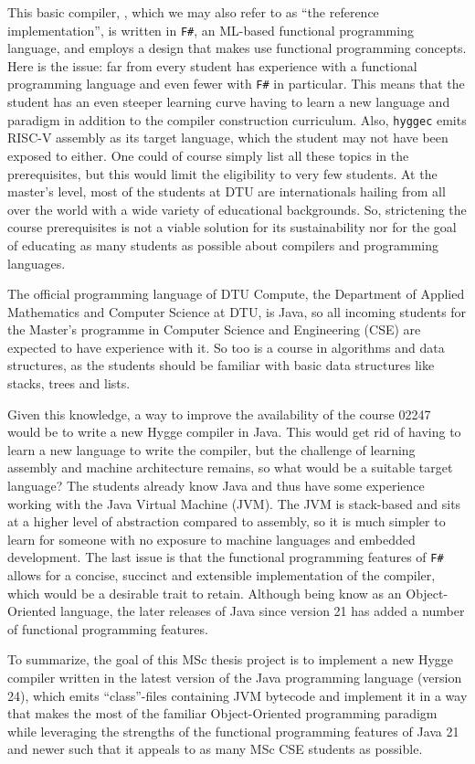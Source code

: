This basic compiler, , which we may also refer to as ``the reference implementation'', is written in \texttt{F#},
an ML-based functional programming language, and employs a design that makes use functional programming concepts.
Here is the issue: far from every student has experience with a functional programming language and even fewer with \texttt{F#}
in particular. This means that the student has an even steeper learning curve having to learn a new language and paradigm
in addition to the compiler construction curriculum. Also, \texttt{hyggec} emits RISC-V assembly as its target language,
which the student may not have been exposed to either. One could of course simply list all these topics in the prerequisites,
but this would limit the eligibility to very few students. At the master's level, most of the students at DTU are internationals
hailing from all over the world with a wide variety of educational backgrounds. So, strictening the course prerequisites is not
a viable solution for its sustainability nor for the goal of educating as many students as possible about compilers and programming
languages.

The official programming language of DTU Compute, the Department of Applied Mathematics and Computer Science at DTU, is Java, so
all incoming students for the Master's programme in Computer Science and Engineering (CSE) are expected to have experience with it.
So too is a course in algorithms and data structures, as the students should be familiar with basic data structures like stacks, trees and lists.

Given this knowledge, a way to improve the availability of the course 02247 would be to write a new Hygge compiler in Java. This would
get rid of having to learn a new language to write the compiler, but the challenge of learning assembly and machine architecture remains,
so what would be a suitable target language? The students already know Java and thus have some experience working with the Java Virtual Machine (JVM).
The JVM is stack-based and sits at a higher level of abstraction compared to assembly, so it is much simpler to learn for someone with no exposure
to machine languages and embedded development. The last issue is that the functional programming features of \texttt{F#} allows for a concise, 
succinct and extensible implementation of the compiler, which would be a desirable trait to retain. Although being know as an Object-Oriented
language, the later releases of Java since version 21 has added a number of functional programming features.

To summarize, the goal of this MSc thesis project is to implement a new Hygge compiler written in the latest version of the Java programming
language (version 24), which emits ``class''-files containing JVM bytecode and implement it in a way that makes the most of the familiar
Object-Oriented programming paradigm while leveraging the strengths of the functional programming features of Java 21 and newer such that
it appeals to as many MSc CSE students as possible.
